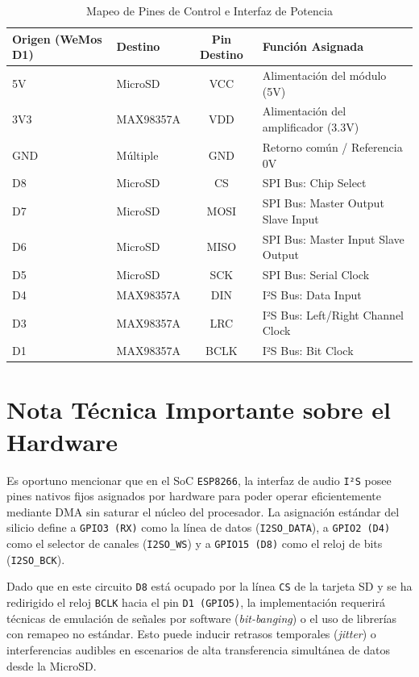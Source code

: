 \documentclass[11pt,a4paper]{article}
\begin{document}
\begin{table}[htbp]
\centering
\caption{Mapeo de Pines de Control e Interfaz de Potencia}
\vspace{2mm}
\begin{tabular}{llcl}
\toprule
\textbf{Origen (WeMos D1)} & \textbf{Destino} & \textbf{Pin Destino} & \textbf{Función Asignada} \\
\midrule
5V  & MicroSD   & VCC  & Alimentación del módulo (5V) \\
3V3 & MAX98357A & VDD  & Alimentación del amplificador (3.3V) \\
GND & Múltiple  & GND  & Retorno común / Referencia 0V \\
D8  & MicroSD   & CS   & SPI Bus: Chip Select \\
D7  & MicroSD   & MOSI & SPI Bus: Master Output Slave Input \\
D6  & MicroSD   & MISO & SPI Bus: Master Input Slave Output \\
D5  & MicroSD   & SCK  & SPI Bus: Serial Clock \\
D4  & MAX98357A & DIN  & I²S Bus: Data Input \\
D3  & MAX98357A & LRC  & I²S Bus: Left/Right Channel Clock \\
D1  & MAX98357A & BCLK & I²S Bus: Bit Clock \\
\bottomrule
\end{tabular}
\end{table}

\section{Nota Técnica Importante sobre el Hardware}
Es oportuno mencionar que en el SoC \texttt{ESP8266}, la interfaz de audio \texttt{I²S} posee pines nativos fijos asignados por hardware para poder operar eficientemente mediante DMA sin saturar el núcleo del procesador. 
La asignación estándar del silicio define a \texttt{GPIO3 (RX)} como la línea de datos (\texttt{I2SO\_DATA}), a \texttt{GPIO2 (D4)} como el selector de canales (\texttt{I2SO\_WS}) y a \texttt{GPIO15 (D8)} como el reloj de bits (\texttt{I2SO\_BCK}). 

Dado que en este circuito \texttt{D8} está ocupado por la línea \texttt{CS} de la tarjeta SD y se ha redirigido el reloj \texttt{BCLK} hacia el pin \texttt{D1 (GPIO5)}, la implementación requerirá técnicas de emulación de señales por software (\textit{bit-banging}) o el uso de librerías con remapeo no estándar. Esto puede inducir retrasos temporales (\textit{jitter}) o interferencias audibles en escenarios de alta transferencia simultánea de datos desde la MicroSD.
\end{document}
